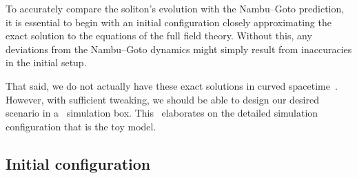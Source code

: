 



\newcommand{\epsA}{\ALIASepsA}
\newcommand{\epsB}{\ALIASepsB}
\newcommand{\epsC}{\ALIASepsC}
\newcommand{\hpAB}{\ALIAShpAB}
\newcommand{\hpA}{\ALIAShpA}
\newcommand{\hpB}{\ALIAShpB}
\newcommand{\hpC}{\ALIAShpC}





To accurately compare the soliton's evolution with the Nambu--Goto prediction, it is essential to begin with an initial configuration closely approximating the exact solution to the equations of the full field theory. Without this, any deviations from the Nambu--Goto dynamics might simply result from inaccuracies in the initial setup.

That said, we do not actually have these exact solutions in curved spacetime~. However, with sufficient tweaking, we should be able to design our desired scenario in a~\gevolution{} simulation box.
This~ elaborates on the detailed simulation configuration that is the toy model.





\subsection{Initial configuration}\label{sec:PT:gwas:initial_config}

